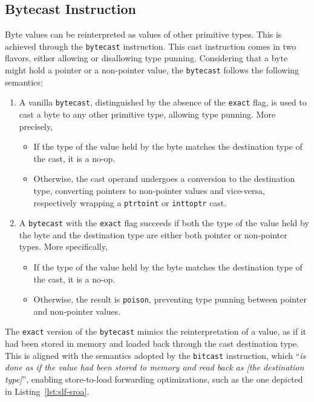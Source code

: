 \documentclass[a4paper,12pt]{article}
\begin{document}
\subsection{Bytecast Instruction}

Byte values can be reinterpreted as values of other primitive types.
This is achieved through the \texttt{bytecast} instruction.
This cast instruction comes in two flavors, either allowing or disallowing type punning.
Considering that a byte might hold a pointer or a non-pointer value, the \texttt{bytecast} follows the following semantics:

\begin{enumerate}
  \item A vanilla \texttt{bytecast}, distinguished by the absence of the \texttt{exact} flag, is used to cast a byte to any other primitive type, allowing type punning. More precisely,
  \begin{itemize}
    \item If the type of the value held by the byte matches the destination type of the cast, it is a no-op.
    \item Otherwise, the cast operand undergoes a conversion to the destination type, converting pointers to non-pointer values and vice-versa, respectively wrapping a \texttt{ptrtoint} or \texttt{inttoptr} cast.
  \end{itemize}

  \item A \texttt{bytecast} with the \texttt{exact} flag succeeds if both the type of the value held by the byte and the destination type are either both pointer or non-pointer types. More specifically,
  \begin{itemize}
    \item If the type of the value held by the byte matches the destination type of the cast, it is a no-op.
    \item Otherwise, the result is \texttt{poison}, preventing type punning between pointer and non-pointer values.
  \end{itemize}
\end{enumerate}

The \texttt{exact} version of the \texttt{bytecast} mimics the reinterpretation of a value, as if it had been stored in memory and loaded back through the cast destination type.
This is aligned with the semantics adopted by the \texttt{bitcast} instruction, which ``\textit{is done as if the value had been stored to memory and read back as [the destination type]}'', enabling store-to-load forwarding optimizations, such as the one depicted in Listing~\ref{lst:slf-sroa}.
\end{document}
